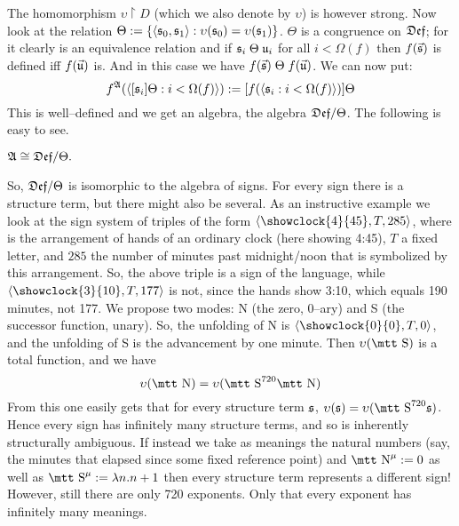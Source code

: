 The homomorphism $\upsilon \restriction D$ (which we also denote by
$\upsilon$) is however strong. Now look at the relation
$\Theta := \{\langle \mathfrak{s}_0, \mathfrak{s}_1\rangle : \upsilon(\mathfrak{s}_0) =
\upsilon(\mathfrak{s}_1)\}$. $\Theta$ is a congruence on $\mathfrak{Def}$; for it clearly
is an equivalence relation and if $\mathfrak{s}_i\; \Theta\; \mathfrak{u}_i$ for all 
$i < \Omega(f)$ then $f(\vec{\mathfrak{s}})$ is defined iff $f(\vec{\mathfrak{u}})$ is. 
And in this case we have $f(\vec{\mathfrak{s}}) \; \Theta\; f(\vec{\mathfrak{u}})$.
We can now put:
\begin{equation}
f^{\mathfrak{A}}(\langle [\mathfrak{s}_i]{\Theta} : i < \Omega(f)\rangle)
:= [f(\langle \mathfrak{s}_i : i < \Omega(f)\rangle)]{\Theta}
\end{equation}
This is well--defined and we get an algebra, the algebra
$\mathfrak{Def}/\Theta$. The following is easy to see.
\begin{prop}
$\mathfrak{A} \cong\mathfrak{Def}/\Theta.$
\end{prop}
So, $\mathfrak{Def}/\Theta$ is isomorphic to the algebra of signs. 
For every sign there is a structure term, but there might 
also be several. As an instructive example we look at the
sign system of triples of the form $\auf \mbox{\showclock{4}{45}}, 
T, 285\zu$, where  is the arrangement of 
hands of an ordinary clock (here showing 4:45), $T$ a fixed 
letter, and $285$ the number of minutes past midnight/noon 
that is symbolized by this arrangement. So, the above triple 
is a sign of the language, while $\auf \mbox{\showclock{3}{10}}, 
T, 177\zu$ is not, since the hands show 3:10, which equals 190 
minutes, not 177. We propose two modes: {\mtt N} (the zero, 0--ary) 
and {\mtt S} (the successor function, unary). So, the unfolding of 
{\mtt N} is $\auf \mbox{\showclock{0}{0}}, T, 0\zu$, and the unfolding 
of {\mtt S} is the advancement by one minute. Then 
$\upsilon(\mbox{\mtt S})$ is a total function, and we have
\begin{equation}
\upsilon(\mbox{\mtt N}) = \upsilon(\mbox{\mtt S}^{720}\mbox{\mtt N}) 
\end{equation}
From this one easily gets that for every structure term 
$\mathfrak{s}$, $\upsilon(\Gs) = \upsilon(\mbox{\mtt S}^{720}\Gs)$. 
Hence every sign has infinitely many structure terms, and so is
inherently structurally ambiguous. If instead we take as meanings 
the natural numbers (say, the minutes that elapsed since some fixed 
reference point) and $\mbox{\mtt N}^{\mu} := 0$ as well as 
$\mbox{\mtt S}^{\mu} := \lambda n.n+1$ then every structure term 
represents a different sign! However, still there are only 720 
exponents. Only that every exponent has infinitely many meanings.

